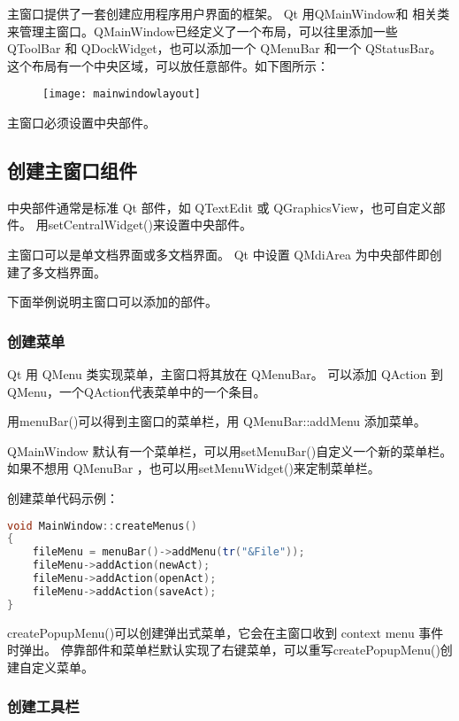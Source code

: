 主窗口提供了一套创建应用程序用户界面的框架。 Qt 用QMainWindow和 相关类 来管理主窗口。QMainWindow已经定义了一个布局，可以往里添加一些 QToolBar 和 QDockWidget，也可以添加一个 QMenuBar 和一个 QStatusBar。这个布局有一个中央区域，可以放任意部件。如下图所示：

\begin{figure}[hbt!]  
	\centering
    \texttt{[image: mainwindowlayout]}
\end{figure}

\begin{notice}
主窗口必须设置中央部件。
\end{notice}

\subsection{创建主窗口组件}

中央部件通常是标准 Qt 部件，如 QTextEdit 或 QGraphicsView，也可自定义部件。
用setCentralWidget()来设置中央部件。

主窗口可以是单文档界面或多文档界面。 
Qt 中设置 QMdiArea 为中央部件即创建了多文档界面。

下面举例说明主窗口可以添加的部件。

\subsubsection{创建菜单}

Qt 用 QMenu 类实现菜单，主窗口将其放在 QMenuBar。
可以添加 QAction 到QMenu，一个QAction代表菜单中的一个条目。

用menuBar()可以得到主窗口的菜单栏，用 QMenuBar::addMenu 添加菜单。

QMainWindow 默认有一个菜单栏，可以用setMenuBar()自定义一个新的菜单栏。
如果不想用 QMenuBar ，也可以用setMenuWidget()来定制菜单栏。

创建菜单代码示例：

\begin{lstlisting}[language=C++]
void MainWindow::createMenus()
{
    fileMenu = menuBar()->addMenu(tr("&File"));
    fileMenu->addAction(newAct);
    fileMenu->addAction(openAct);
    fileMenu->addAction(saveAct);
}
\end{lstlisting}

createPopupMenu()可以创建弹出式菜单，它会在主窗口收到 context menu 事件时弹出。
停靠部件和菜单栏默认实现了右键菜单，可以重写createPopupMenu()创建自定义菜单。

\subsubsection{创建工具栏}

